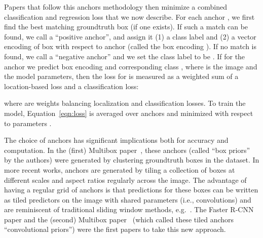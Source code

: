 \documentclass[10pt,twocolumn,letterpaper]{article}
\begin{document}
 Papers that follow this anchors methodology then minimize a combined classification and regression loss that we now describe.
For each anchor , we first find the best matching groundtruth box  (if one exists).  If such a match can be found, we call  a ``positive anchor'',
and assign it (1) a class label 
and (2) a vector encoding of box  with respect to anchor 
(called the box encoding ).
If no match is found, we call  a ``negative anchor'' and we set the 
class label to be .
If for the anchor  we predict box encoding   and corresponding class ,
where  is the image and  the model parameters,
then the loss for  is measured as a weighted sum of a location-based loss and a classification loss:\vspace{-3mm}

{\footnotesize

}
where  are weights balancing localization and classification losses.  To train the model, Equation~\ref{eqn:loss} is averaged over anchors and minimized with respect to parameters .


The choice of anchors has significant implications both for accuracy and computation.  In the (first) Multibox paper~\cite{erhan2014scalable}, these anchors (called ``box priors'' by the authors) were generated by clustering groundtruth boxes in the dataset.  In more recent works, anchors are generated by tiling a collection of boxes at different scales and aspect ratios regularly across the image.  The advantage of having a regular grid of anchors is that predictions for these boxes can be written as tiled predictors on the image with shared parameters (i.e., convolutions) and are reminiscent of traditional sliding window methods, e.g.~\cite{viola2004robust}.  The Faster R-CNN~\cite{ren2015faster} paper and the (second) Multibox paper~\cite{szegedy2014scalable} (which called these tiled anchors ``convolutional priors'') were the first papers to take this new approach.
\end{document}
